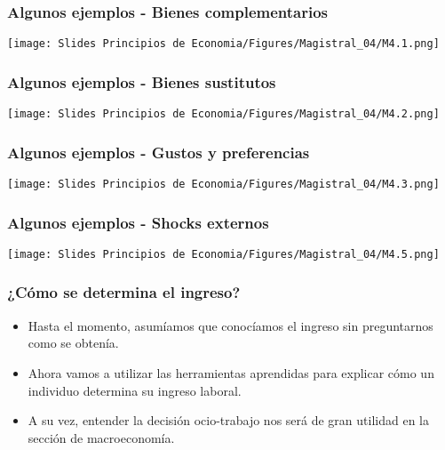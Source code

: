 \documentclass{beamer}
\begin{document}

\begin{frame}
\frametitle{Algunos ejemplos - Bienes complementarios}
    \begin{center}
    \texttt{[image: Slides Principios de Economia/Figures/Magistral\_04/M4.1.png]}
    \end{center}
\end{frame}

\begin{frame}
\frametitle{Algunos ejemplos - Bienes sustitutos}
    \begin{center}
    \texttt{[image: Slides Principios de Economia/Figures/Magistral\_04/M4.2.png]}
    \end{center}
\end{frame}

\begin{frame}
\frametitle{Algunos ejemplos - Gustos y preferencias}
    \begin{center}
    \texttt{[image: Slides Principios de Economia/Figures/Magistral\_04/M4.3.png]}
    \end{center}
\end{frame}

\begin{frame}
\frametitle{Algunos ejemplos - Shocks externos}
    \begin{center}
    \texttt{[image: Slides Principios de Economia/Figures/Magistral\_04/M4.5.png]}
    \end{center}
\end{frame}





\begin{frame}
\frametitle{¿Cómo se determina el ingreso?}
\begin{itemize}
    \item Hasta el momento, asumíamos que  conocíamos el ingreso sin preguntarnos como se obtenía. 
    \item Ahora vamos a utilizar las herramientas aprendidas para explicar cómo un individuo determina su ingreso laboral.
    \item A su vez, entender la decisión ocio-trabajo nos será de gran utilidad en la sección de macroeconomía. 
\end{itemize}
\end{frame}
\end{document}
